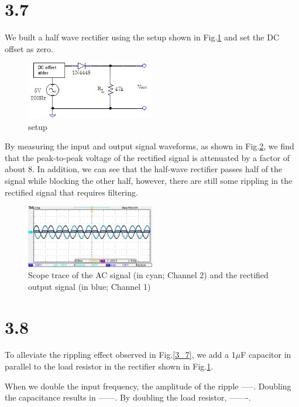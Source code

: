 \documentclass[authoryear, 12pt,5p, times]{elsarticle}
\begin{document}
\section*{3.7}\label{3_7_q}
We built a half wave rectifier using the setup shown in Fig.\ref{3_7_setup} and set the DC offset as zero. 
\begin{figure}[h!]
\center
\includegraphics[width=0.5\textwidth]{figure/3_7_setup}
\caption{ setup}
\label{3_7_setup}
\end{figure}
By measuring the input and output signal waveforms, as shown in Fig.\ref{3_7_trace}, we find that the peak-to-peak voltage of the rectified signal is attenuated by a factor of about 8. In addition, we can see that the half-wave rectifier passes half of the signal while blocking the other half, however, there are still some rippling in the rectified signal that requires filtering.
\begin{figure}[h!]
\center
\includegraphics[width=0.5\textwidth]{figure/3_7}
\caption{Scope trace of the AC signal (in cyan; Channel 2) and the rectified output signal (in blue; Channel 1)}
\label{3_7_trace}
\end{figure}
\section*{3.8}
To alleviate the rippling effect observed in Fig.\ref{3_7}, we add a 1$\mu$F capacitor in parallel to the load resistor in the rectifier shown in Fig.\ref{3_7_setup}.

When we double the input frequency, the amplitude of the ripple -----. Doubling the capacitance results in ------. By doubling the load resistor, -------.
\end{document}
